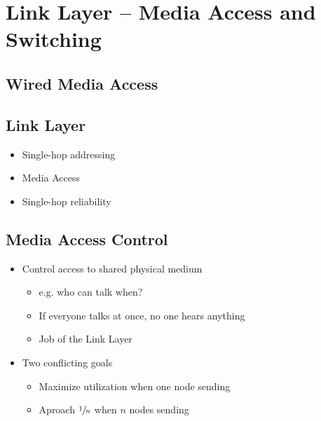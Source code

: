 \section{Link Layer -- Media Access and Switching}
\subsection{Wired Media Access}
\begin{figure}[H]
\end{figure}

\subsection{Link Layer}
\begin{itemize}[nosep]
    \item Single-hop addressing
    \item Media Access
    \item Single-hop reliability
\end{itemize}

\subsection{Media Access Control}
\begin{itemize}[nosep]
    \item Control access to shared physical medium
          \begin{itemize}[nosep]
              \item e.g. who can talk when?
              \item If everyone talks at once, no one hears anything
              \item Job of the Link Layer
          \end{itemize}
    \item Two conflicting goals
          \begin{itemize}[nosep]
              \item Maximize utilization when one node sending
              \item Aproach $\sfrac{1}{n}$ when $n$ nodes sending
          \end{itemize}
\end{itemize}

